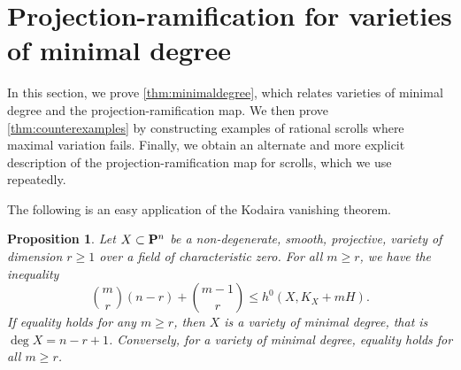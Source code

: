 \documentclass[11pt,reqno]{amsart}
\theoremstyle{plain}
\newtheorem{proposition}[theorem]{Proposition}
\theoremstyle{definition}
\theoremstyle{remark}
\numberwithin{equation}{section}
\numberwithin{equation}{section}
\begin{document}
\section{Projection-ramification for varieties of minimal degree}\label{sec:minimaldegree}
In this section, we prove \autoref{thm:minimaldegree}, which relates varieties of minimal degree and the projection-ramification map.
We then prove \autoref{thm:counterexamples} by constructing examples of rational scrolls where maximal variation fails.
Finally, we obtain an alternate and more explicit description of the projection-ramification map for scrolls, which we use repeatedly.

The following is an easy application of the Kodaira vanishing theorem.
\begin{proposition}\label{lem:kymh}
  Let $X \subset \P^n$ be a non-degenerate, smooth, projective, variety of dimension $r \geq 1$ over a field of characteristic zero.
  For all $m \geq r$, we have the inequality
  \begin{equation}\label{eqn:KYmH}
    {m \choose r}(n-r) + {{m-1} \choose {r}}\leq h^0(X, K_X + mH).
  \end{equation}
  If equality holds for any $m \geq r$, then $X$ is a variety of minimal degree, that is $\deg X = n-r+1$.
  Conversely, for a variety of minimal degree, equality holds for all $m \geq r$.
\end{proposition}
\end{document}
